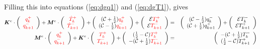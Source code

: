 Filling this into equations (\ref{eq:dgq1}) and (\ref{eq:dgT1}), gives 
\begin{eqnarray}
{\bm K}^e \cdot 
\left( 
\begin{array}{cc}
    {\color{red}q_k^+}  \\
    {\color{red}q_{k+1}^-}
\end{array}
\right)
+
{\bm M}^e \cdot 
\left(
\begin{array}{c}
{\color{red}\dot{T}_k^+}  \\
{\color{red}\dot{T}_{k+1}^-} 
\end{array}
\right) 
+ 
\left(
\begin{array}{cc}
     ({\cal C}+\frac{1}{2})  {\color{red}q_k^+}  \\
     ({\cal C}-\frac{1}{2})  {\color{red}q_{k+1}^-} 
\end{array}
\right)+
\left(
\begin{array}{c}
     {\cal E}    {\color{red}T_k^+}  \\
     {\cal E}    {\color{red}T_{k+1}^-} 
\end{array}
\right) 
&=& 
\left(
\begin{array}{cc}
     ({\cal C}-\frac{1}{2}) q_k^-  \\
     ({\cal C}+\frac{1}{2}) q_{k+1}^+ 
\end{array}
\right)
+ \left(
\begin{array}{cc}
     {\cal E}   T_k^-  \\
     {\cal E}   T_{k+1}^+
\end{array}
\right)  
\nonumber
\\
{\bm M}^e \cdot
\left(
\begin{array}{cc}
    {\color{red}q_k^+}  \\
    {\color{red}q_{k+1}^-}
\end{array}
\right)+
{\bm K}^e \cdot
\left(
\begin{array}{cc}
 {\color{red}T_k^+}  \\
{\color{red}T_{k+1}^-} 
\end{array}
\right) 
+ \left(
\begin{array}{cc}
     (\frac{1}{2}-{\cal C}) {\color{red}T_k^+}  \\
     -({\cal C}+\frac{1}{2}){\color{red}T_{k+1}^-} 
\end{array}
\right)
&=& \left(
\begin{array}{cc}
     -({\cal C}+\frac{1}{2})  T_k^- \\
     (\frac{1}{2}-{\cal C})  T_{k+1}^+ 
\end{array}
\right) 
\end{eqnarray}










